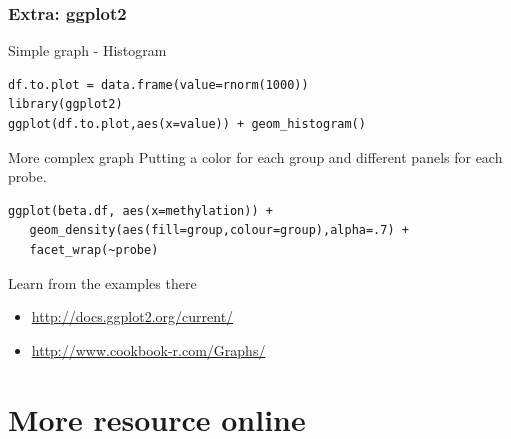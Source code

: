 \documentclass[10pt]{beamer}
\newenvironment{xframe}[2][]
  {\begin{frame}[fragile,environment=xframe,#1]
  \frametitle{#2}}
  {\end{frame}}
\begin{document}
\begin{xframe}{Extra: {\sf ggplot2}}
  \begin{block}{Simple graph - Histogram}
\begin{verbatim}
df.to.plot = data.frame(value=rnorm(1000))
library(ggplot2)
ggplot(df.to.plot,aes(x=value)) + geom_histogram()
\end{verbatim}      
  \end{block}
  \begin{block}{More complex graph}
    Putting a color for each group and different panels for each probe.
\begin{verbatim}
ggplot(beta.df, aes(x=methylation)) + 
   geom_density(aes(fill=group,colour=group),alpha=.7) + 
   facet_wrap(~probe)
\end{verbatim}      
  \end{block}
  \begin{exampleblock}{Learn from the examples there}
    \begin{itemize}
    \item \url{http://docs.ggplot2.org/current/}
    \item \url{http://www.cookbook-r.com/Graphs/}
    \end{itemize}
  \end{exampleblock}
\end{xframe}

\section{More resource online}
\end{document}
